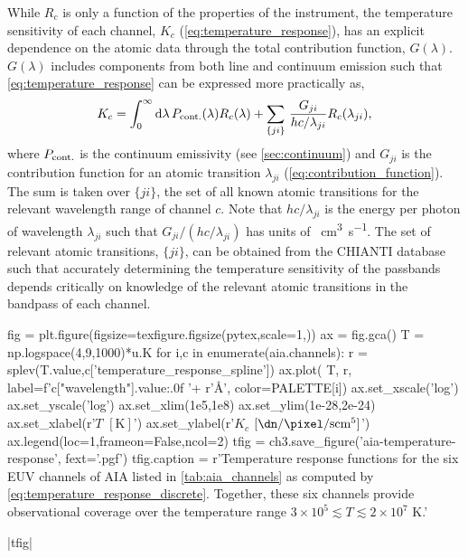 While $R_c$ is only a function of the properties of the instrument, the temperature sensitivity of each channel, $K_c$ (\autoref{eq:temperature_response}), has an explicit dependence on the atomic data through the total contribution function, $G(\lambda)$. $G(\lambda)$ includes components from both line and continuum emission such that \autoref{eq:temperature_response} can be expressed more practically as,
\begin{equation}\label{eq:temperature_response_discrete}
    K_c = \int_0^\infty\textup{d}\lambda\,P_{\textup{cont.}}(\lambda)R_c(\lambda)  + \sum_{\{ji\}}\,\frac{G_{ji}}{hc/\lambda_{ji}}R_c(\lambda_{ji}),
\end{equation}
where $P_{\textup{cont.}}$ is the continuum emissivity (see \autoref{sec:continuum}) and $G_{ji}$ is the contribution function for an atomic transition $\lambda_{ji}$ (\autoref{eq:contribution_function}). The sum is taken over $\{ji\}$, the set of all known atomic transitions for the relevant wavelength range of channel $c$. Note that $hc/\lambda_{ji}$ is the energy per photon of wavelength $\lambda_{ji}$ such that $G_{ji}/(hc/\lambda_{ji})$ has units of \si{\photon\cubic\cm\per\second}. The set of relevant atomic transitions, $\{ji\}$, can be obtained from the CHIANTI database such that accurately determining the temperature sensitivity of the passbands depends critically on knowledge of the relevant atomic transitions in the bandpass of each channel.

\begin{pycode}[chapter3]
fig = plt.figure(figsize=texfigure.figsize(pytex,scale=1,))
ax = fig.gca()
T = np.logspace(4,9,1000)*u.K
for i,c in enumerate(aia.channels):
    r = splev(T.value,c['temperature_response_spline'])
    ax.plot(
        T, r,
        label=f'{c["wavelength"].value:.0f} '+ r'$\si{\angstrom}$',
        color=PALETTE[i])
ax.set_xscale('log')
ax.set_yscale('log')
ax.set_xlim(1e5,1e8)
ax.set_ylim(1e-28,2e-24)
ax.set_xlabel(r'$T$ $[\si{\kelvin}]$')
ax.set_ylabel(r'$K_c$ $[\si{\dn\per\pixel\per\second\cm\tothe{5}}]$')
ax.legend(loc=1,frameon=False,ncol=2)
tfig = ch3.save_figure('aia-temperature-response', fext='.pgf')
tfig.caption = r'Temperature response functions for the six EUV channels of AIA listed in \autoref{tab:aia_channels} as computed by \autoref{eq:temperature_response_discrete}. Together, these six channels provide observational coverage over the temperature range $3\times10^5\lesssim T\lesssim2\times10^7$ \si{\kelvin}.'
\end{pycode}
\py[chapter3]|tfig|

